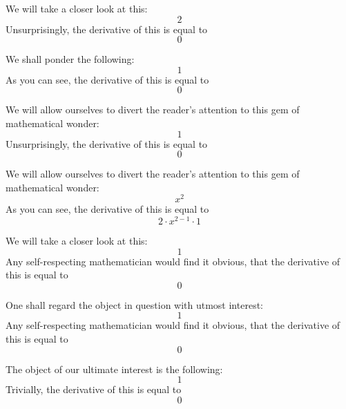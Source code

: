 \documentclass{article}
\begin{document}
We will take a closer look at this:
\begin{equation}
2 
\end{equation}
Unsurprisingly, the derivative of this is equal to
\begin{equation}
0 
\end{equation}

We shall ponder the following:
\begin{equation}
1 
\end{equation}
As you can see, the derivative of this is equal to
\begin{equation}
0 
\end{equation}

We will allow ourselves to divert the reader's attention to this gem of mathematical wonder:
\begin{equation}
1 
\end{equation}
Unsurprisingly, the derivative of this is equal to
\begin{equation}
0 
\end{equation}

We will allow ourselves to divert the reader's attention to this gem of mathematical wonder:
\begin{equation}
x ^{2 } 
\end{equation}
As you can see, the derivative of this is equal to
\begin{equation}
2 \cdot x ^{2 - 1 } \cdot 1 
\end{equation}

We will take a closer look at this:
\begin{equation}
1 
\end{equation}
Any self-respecting mathematician would find it obvious, that the derivative of this is equal to
\begin{equation}
0 
\end{equation}

One shall regard the object in question with utmost interest:
\begin{equation}
1 
\end{equation}
Any self-respecting mathematician would find it obvious, that the derivative of this is equal to
\begin{equation}
0 
\end{equation}

The object of our ultimate interest is the following:
\begin{equation}
1 
\end{equation}
Trivially, the derivative of this is equal to
\begin{equation}
0 
\end{equation}
\end{document}
